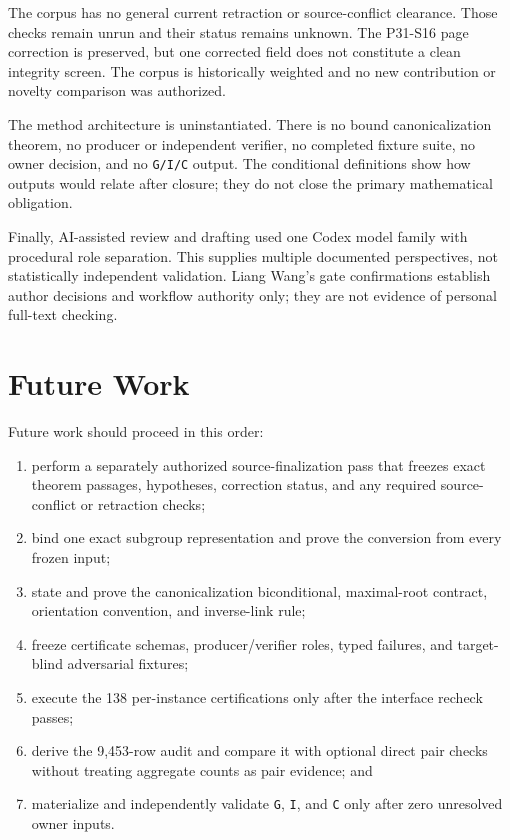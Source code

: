 \documentclass[11pt]{article}
\providecommand{\tightlist}{\setlength{\itemsep}{0pt}\setlength{\parskip}{0pt}}
\begin{document}
The corpus has no general current retraction or source-conflict
clearance. Those checks remain unrun and their status remains unknown.
The P31-S16 page correction is
preserved, but one corrected field does not constitute a clean integrity
screen. The corpus is historically weighted and no new contribution or
novelty comparison was authorized.

The method architecture is uninstantiated. There is no bound
canonicalization theorem, no producer or independent verifier, no
completed fixture suite, no owner decision, and no \texttt{G/I/C}
output. The conditional definitions show how outputs would relate after
closure; they do not close the primary mathematical obligation.

Finally, AI-assisted review and drafting used one Codex model family
with procedural role separation. This supplies multiple documented
perspectives, not statistically independent validation. Liang Wang's
gate confirmations establish author decisions and workflow authority
only; they are not evidence of personal full-text checking.

\hypertarget{9-future-work}{%
\section{Future Work}\label{9-future-work}}

Future work should proceed in this order:

\begin{enumerate}
\def\labelenumi{\arabic{enumi}.}
\tightlist
\item
  perform a separately authorized source-finalization pass that freezes
  exact theorem passages, hypotheses, correction status, and any
  required source-conflict or retraction checks;
\item
  bind one exact subgroup representation and prove the conversion from
  every frozen input;
\item
  state and prove the canonicalization biconditional, maximal-root
  contract, orientation convention, and inverse-link rule;
\item
  freeze certificate schemas, producer/verifier roles, typed failures,
  and target-blind adversarial fixtures;
\item
  execute the 138 per-instance certifications only after the interface
  recheck passes;
\item
  derive the 9,453-row audit and compare it with optional direct pair
  checks without treating aggregate counts as pair evidence; and
\item
  materialize and independently validate \texttt{G}, \texttt{I}, and
  \texttt{C} only after zero unresolved owner inputs.
\end{enumerate}
\end{document}
